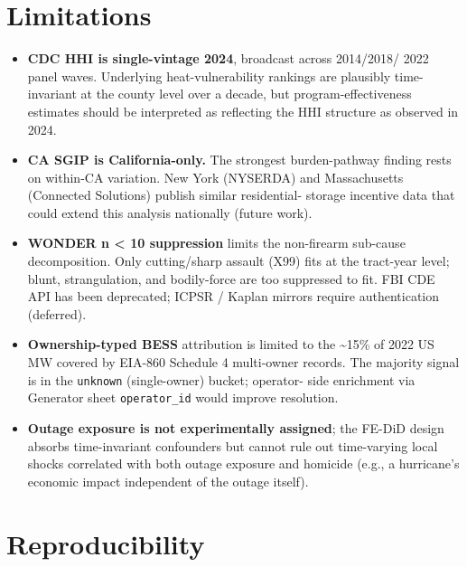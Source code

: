 \documentclass[
]{article}
\providecommand{\tightlist}{%
  \setlength{\itemsep}{0pt}\setlength{\parskip}{0pt}}
\begin{document}
\hypertarget{limitations}{%
\section{Limitations}\label{limitations}}

\begin{itemize}
\tightlist
\item
  \textbf{CDC HHI is single-vintage 2024}, broadcast across 2014/2018/
  2022 panel waves. Underlying heat-vulnerability rankings are plausibly
  time-invariant at the county level over a decade, but
  program-effectiveness estimates should be interpreted as reflecting
  the HHI structure as observed in 2024.
\item
  \textbf{CA SGIP is California-only.} The strongest burden-pathway
  finding rests on within-CA variation. New York (NYSERDA) and
  Massachusetts (Connected Solutions) publish similar residential-
  storage incentive data that could extend this analysis nationally
  (future work).
\item
  \textbf{WONDER n \textless{} 10 suppression} limits the non-firearm
  sub-cause decomposition. Only cutting/sharp assault (X99) fits at the
  tract-year level; blunt, strangulation, and bodily-force are too
  suppressed to fit. FBI CDE API has been deprecated; ICPSR / Kaplan
  mirrors require authentication (deferred).
\item
  \textbf{Ownership-typed BESS} attribution is limited to the
  \textasciitilde15\% of 2022 US MW covered by EIA-860 Schedule 4
  multi-owner records. The majority signal is in the \texttt{unknown}
  (single-owner) bucket; operator- side enrichment via Generator sheet
  \texttt{operator\_id} would improve resolution.
\item
  \textbf{Outage exposure is not experimentally assigned}; the FE-DiD
  design absorbs time-invariant confounders but cannot rule out
  time-varying local shocks correlated with both outage exposure and
  homicide (e.g., a hurricane's economic impact independent of the
  outage itself).
\end{itemize}

\hypertarget{reproducibility}{%
\section{Reproducibility}\label{reproducibility}}
\end{document}
